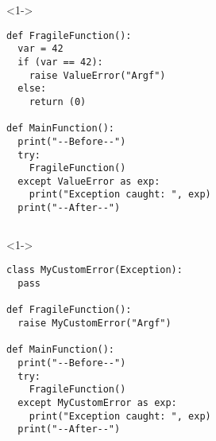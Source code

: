\begin{frame}[fragile]{}

  \begin{columns}[onlytextwidth]
    \begin{column}{\textwidth}
      \begin{onlyenv}<1->
        \begin{lstlisting}[style=python,morekeywords={as}]
def FragileFunction():
  var = 42
  if (var == 42):
    raise ValueError("Argf")
  else:
    return (0)

def MainFunction():
  print("--Before--")
  try:
    FragileFunction()
  except ValueError as exp:
    print("Exception caught: ", exp)
  print("--After--") \end{lstlisting}
      \end{onlyenv}
    \end{column}
  \end{columns}

\end{frame}

\begin{frame}[fragile]{}

    \begin{columns}[onlytextwidth]
    \begin{column}{\textwidth}
      \begin{onlyenv}<1->
        \begin{lstlisting}[style=python,morekeywords={as}]
class MyCustomError(Exception):
  pass

def FragileFunction():
  raise MyCustomError("Argf")

def MainFunction():
  print("--Before--")
  try:
    FragileFunction()
  except MyCustomError as exp:
    print("Exception caught: ", exp)
  print("--After--") \end{lstlisting}
      \end{onlyenv}
    \end{column}
  \end{columns}

\end{frame}

